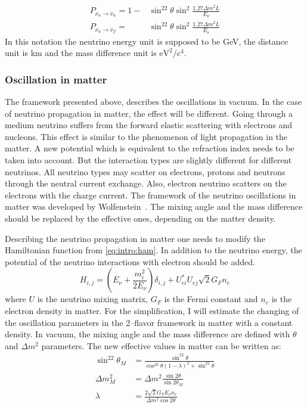\documentclass[../main.tex]{subfiles}
\begin{document}
\begin{align}
P_{\nu_\alpha\to\nu_\alpha}=1-&\sin^22\theta\sin^2\frac{1.27\Delta m^2L}{E_\nu} \\
P_{\nu_\alpha\to\nu_\beta}=&\sin^22\theta\sin^2\frac{1.27\Delta m^2L}{E_\nu}
\end{align}
In this notation the neutrino energy unit is supposed to be GeV, the distance unit is km and the mass difference unit is $\text{eV}^2/\text{c}^4$.

\subsubsection{Oscillation in matter}
\label{sc:intro:mat}
The framework presented above, describes the oscillations in vacuum. In the case of neutrino propagation in matter, the effect will be different. Going through a medium neutrino suffers from the forward elastic scattering with electrons and nucleons. This effect is similar to the phenomenon of light propagation in the matter. A new potential which is equivalent to the refraction index needs to be taken into account. But the interaction types are slightly different for different neutrinos. All neutrino types may scatter on electrons, protons and neutrons through the neutral current exchange. Also, electron neutrino scatters on the electrons with the charge current. The framework of the neutrino oscillations in matter was developed by Wolfenstein~\cite{Wolfenstein1978}. The mixing angle and the mass difference should be replaced by the effective ones, depending on the matter density.


Describing the neutrino propagation in matter one needs to modify the Hamiltonian function from \autoref{eq:intro:ham}. In addition to the neutrino energy, the potential of the neutrino interactions with electron should be added.
\begin{equation}
H_{i,j}=\left(E_\nu+\frac{m_i^2}{2E_\nu}\right)\delta_{i,j}+U_{ei}^*U_{ej}\sqrt2G_Fn_e
\end{equation}
where $U$ is the neutrino mixing matrix, $G_F$ is the Fermi constant and $n_e$ is the electron density in matter. For the simplification, I will estimate the changing of the oscillation parameters in the 2--flavor framework in matter with a constant density. In vacuum, the mixing angle and the mass difference are defined with $\theta$ and $\Delta m^2$ parameters. The new effective values in matter can be written  as:
\begin{align}
\sin^22\theta_M&=\frac{\sin^22\theta}{\cos^22\theta(1-\lambda)^2+\sin^22\theta} \\
\Delta m^2_M&=\Delta m^2\frac{\sin2\theta}{\sin2\theta_M} \\
\lambda&=\frac{2\sqrt2G_FE_\nu n_e}{\Delta m^2\cos2\theta}
\end{align}
\end{document}
